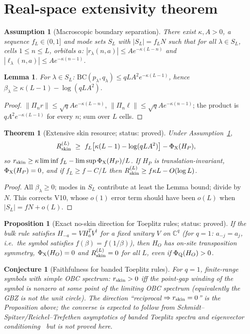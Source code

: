 \documentclass[11pt]{article}
\newtheorem{theorem}{Theorem}
\newtheorem{proposition}{Proposition}
\newtheorem{lemma}{Lemma}
\newtheorem{assumption}{Assumption}
\newtheorem{conjecture}{Conjecture}
\newcommand{\Rskin}{R_{\rm skin}}
\newcommand{\rskin}{r_{\rm skin}}
\newcommand{\PhiQ}{\Phi_{\rm Q}}
\newcommand{\PhiX}{\Phi_{\rm X}}
\newcommand{\BC}{\mathrm{BC}}
\begin{document}
\section{Real-space extensivity theorem}
\begin{assumption}[Macroscopic boundary separation]\label{ass:sep}
There exist $\kappa,A>0$, a sequence $f_L\in(0,1]$ and mode sets $S_L$ with $|S_L|=f_LN$ such that for all $\lambda\in S_L$, cells $1\le n\le L$, orbitals $a$: $|r_\lambda(n,a)|\le Ae^{-\kappa(L-n)}$ and $|\ell_\lambda(n,a)|\le Ae^{-\kappa(n-1)}$.
\end{assumption}
\begin{lemma}\label{lem:ov}
For $\lambda\in S_L$: $\BC(p_\lambda,q_\lambda)\le qLA^2e^{-\kappa(L-1)}$, hence $\beta_\lambda\ge\kappa(L-1)-\log(qLA^2)$.
\end{lemma}
\begin{proof}
$\|\Pi_nr\|\le\sqrt qAe^{-\kappa(L-n)}$, $\|\Pi_n\ell\|\le\sqrt qAe^{-\kappa(n-1)}$; the product is $qA^2e^{-\kappa(L-1)}$ for every $n$; sum over $L$ cells.
\end{proof}
\begin{theorem}[Extensive skin resource; status: proved]\label{thm:extensive}
Under Assumption~\ref{ass:sep},
\[
\Rskin^{(L)}\ \ge\ f_L\big[\kappa(L-1)-\log(qLA^2)\big]-\PhiX(H_P),
\]
so $\rskin\ge\kappa\liminf f_L-\limsup\PhiX(H_P)/L$. If $H_P$ is translation-invariant, $\PhiX(H_P)=0$, and if $f_L\ge f-C/L$ then $\Rskin^{(L)}\ge f\kappa L-O(\log L)$.
\end{theorem}
\begin{proof}
All $\beta_\lambda\ge0$; modes in $S_L$ contribute at least the Lemma bound; divide by $N$. This corrects V10, whose $o(1)$ error term should have been $o(L)$ when $|S_L|=fN+o(L)$.
\end{proof}
\begin{proposition}[Exact no-skin direction for Toeplitz rules; status: proved]
If the bulk rule satisfies $H_{-a}=VH_a^TV^\dagger$ for a fixed unitary $V$ on $\mathbb C^q$ (for $q=1$: $a_{-j}=a_j$, i.e.\ the symbol satisfies $f(\beta)=f(1/\beta)$), then $H_O$ has on-site transposition symmetry, $\PhiX(H_O)=0$ and $\Rskin^{(L)}=0$ for all $L$, even if $\PhiQ(H_O)>0$.
\end{proposition}

\begin{conjecture}[Faithfulness for banded Toeplitz rules]\label{conj:toeplitz}
For $q=1$, finite-range symbols with simple OBC spectrum: $\rskin>0$ iff the point-gap winding of the symbol is nonzero at some point of the limiting OBC spectrum (equivalently the GBZ is not the unit circle). The direction ``reciprocal $\Rightarrow\rskin=0$'' is the Proposition above; the converse is expected to follow from Schmidt--Spitzer/Reichel--Trefethen asymptotics of banded Toeplitz spectra and eigenvector conditioning~\cite{SchmidtSpitzer,ReichelTrefethen} but is \emph{not} proved here.
\end{conjecture}
\end{document}
